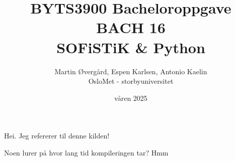 \documentclass[12pt, norsk]{article}
\title{BYTS3900 Bacheloroppgave \\ BACH 16\\SOFiSTiK \& Python}
\author{Martin Øvergård, Espen Karlsen, Antonio Kaelin\\OsloMet - storbyuniversitet}
\date{våren 2025}
\begin{document}
\maketitle

Hei. Jeg refererer til denne kilden! \parencite[s. 27]{testreferanse}


Noen lurer på hvor lang tid kompileringen tar? Hmm



\printbibliography
\end{document}
